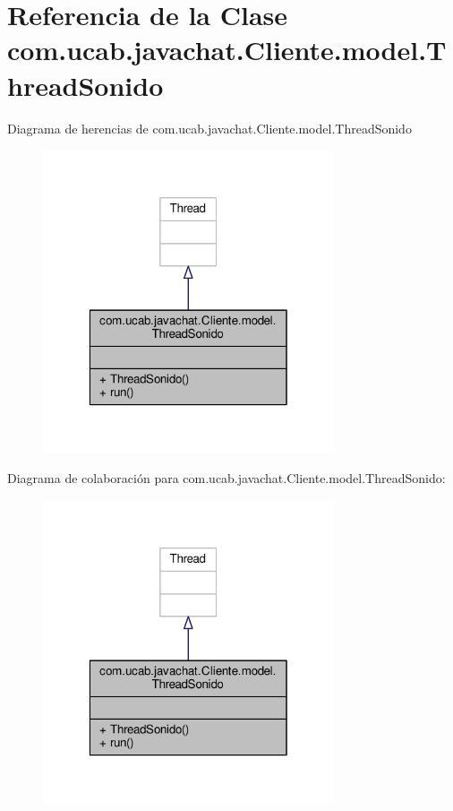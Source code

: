 \hypertarget{classcom_1_1ucab_1_1javachat_1_1_cliente_1_1model_1_1_thread_sonido}{\section{Referencia de la Clase com.\-ucab.\-javachat.\-Cliente.\-model.\-Thread\-Sonido}
\label{classcom_1_1ucab_1_1javachat_1_1_cliente_1_1model_1_1_thread_sonido}
}


Diagrama de herencias de com.\-ucab.\-javachat.\-Cliente.\-model.\-Thread\-Sonido\nopagebreak
\begin{figure}[H]
\begin{center}
\leavevmode
\includegraphics[width=244pt]{classcom_1_1ucab_1_1javachat_1_1_cliente_1_1model_1_1_thread_sonido__inherit__graph}
\end{center}
\end{figure}


Diagrama de colaboración para com.\-ucab.\-javachat.\-Cliente.\-model.\-Thread\-Sonido\-:\nopagebreak
\begin{figure}[H]
\begin{center}
\leavevmode
\includegraphics[width=244pt]{classcom_1_1ucab_1_1javachat_1_1_cliente_1_1model_1_1_thread_sonido__coll__graph}
\end{center}
\end{figure}
